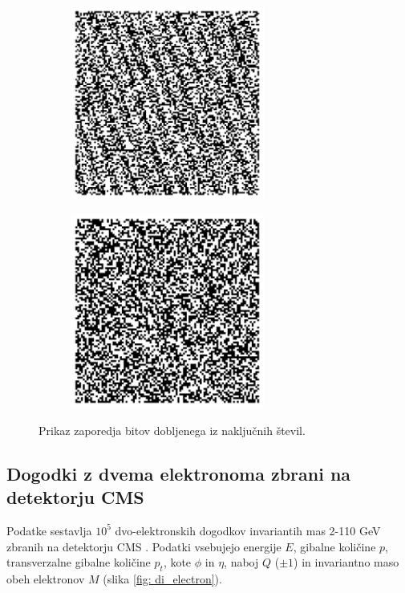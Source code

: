 \documentclass[11pt, oneside]{article}
\theoremstyle{definition}
\begin{document}
\begin{figure}[h!]
    \centering
    \begin{subfigure}[b]{0.49\textwidth}
        \centering
        \includegraphics[width=0.7\textwidth]{mioni_matrika_slaba.png}
        \caption{}
        \label{fig: m1}
    \end{subfigure}
    \hfill
    \begin{subfigure}[b]{0.49\textwidth}
        \centering
        \includegraphics[width=0.7\textwidth]{mioni_matrika_dobra.png}
        \caption{}
        \label{fig: s2}
    \end{subfigure}
    \caption{Prikaz zaporedja bitov dobljenega iz naključnih števil.}
    \label{fig: m}
\end{figure}

\subsection{Dogodki z dvema elektronoma zbrani na detektorju CMS}
Podatke sestavlja $10^5$ dvo-elektronskih dogodkov invariantih mas 2-110 GeV zbranih na detektorju CMS \cite{CMS}.
Podatki vsebujejo energije $E$, gibalne količine $p$, transverzalne gibalne količine $p_t$, kote $\phi$ in $\eta$,
naboj $Q$ ($\pm1$) in invariantno maso obeh elektronov $M$ (slika \ref{fig: di_electron}).
\end{document}
